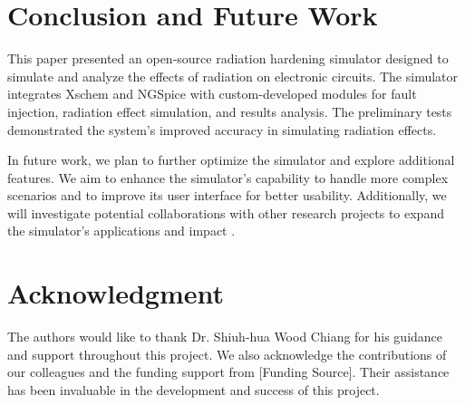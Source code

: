 \documentclass[conference]{IEEEtran}
\begin{document}
\section{Conclusion and Future Work}
This paper presented an open-source radiation hardening simulator designed to simulate and analyze the effects of radiation on electronic circuits. The simulator integrates Xschem and NGSpice with custom-developed modules for fault injection, radiation effect simulation, and results analysis. The preliminary tests demonstrated the system's improved accuracy in simulating radiation effects.

In future work, we plan to further optimize the simulator and explore additional features. We aim to enhance the simulator's capability to handle more complex scenarios and to improve its user interface for better usability. Additionally, we will investigate potential collaborations with other research projects to expand the simulator's applications and impact \cite{Pepper1990}.

\section*{Acknowledgment}
The authors would like to thank Dr. Shiuh-hua Wood Chiang for his guidance and support throughout this project. We also acknowledge the contributions of our colleagues and the funding support from [Funding Source]. Their assistance has been invaluable in the development and success of this project.



\end{document}

